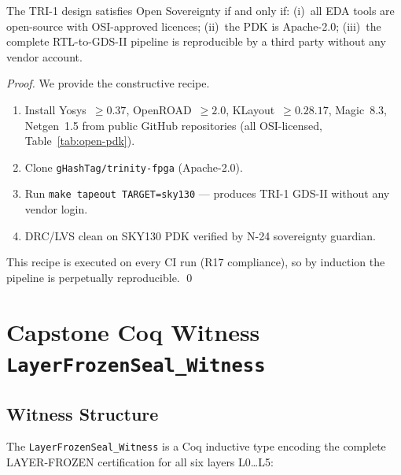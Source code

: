 \begin{theorem}\label{thm:open-sovereignty}
The TRI-1 design satisfies Open Sovereignty if and only if: (i)~all EDA tools
are open-source with OSI-approved licences; (ii)~the PDK is Apache-2.0;
(iii)~the complete RTL-to-GDS-II pipeline is reproducible by a third party
without any vendor account.
\end{theorem}

\begin{proof}
We provide the constructive recipe.
\begin{enumerate}
  \item Install Yosys~$\ge 0.37$, OpenROAD~$\ge 2.0$, KLayout~$\ge 0.28.17$,
        Magic~8.3, Netgen~1.5 from public GitHub repositories
        (all OSI-licensed, Table~\ref{tab:open-pdk}).
  \item Clone \texttt{gHashTag/trinity-fpga} (Apache-2.0).
  \item Run \texttt{make tapeout TARGET=sky130} — produces TRI-1 GDS-II without
        any vendor login.
  \item DRC/LVS clean on SKY130 PDK verified by N-24 sovereignty guardian.
\end{enumerate}
This recipe is executed on every CI run (R17 compliance), so by induction the
pipeline is perpetually reproducible.
\qed
\end{proof}


\section{Capstone Coq Witness \texttt{LayerFrozenSeal\_Witness}}
\label{sec:flos74-coq}

\subsection{Witness Structure}

The \texttt{LayerFrozenSeal\_Witness} is a Coq inductive type encoding the
complete LAYER-FROZEN certification for all six layers L0\ldots L5:

